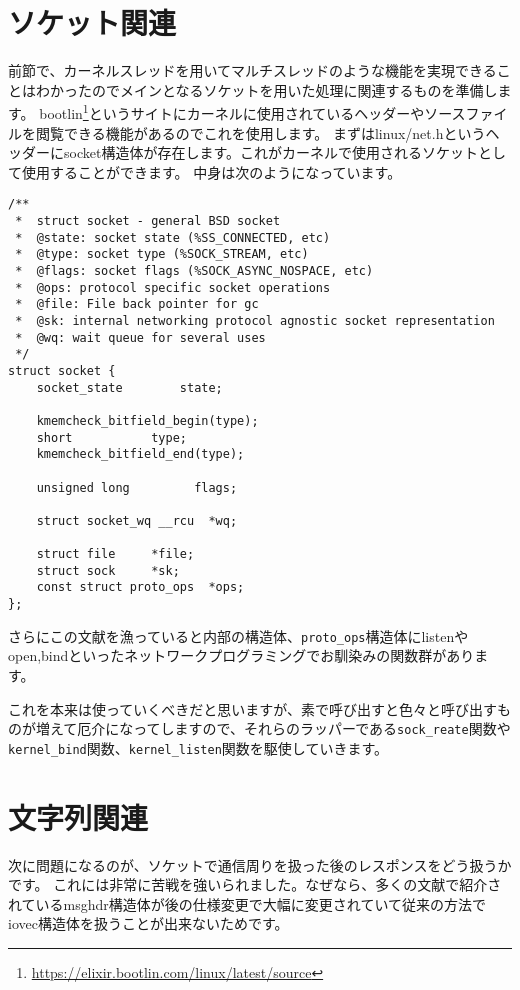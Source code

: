 \section{ソケット関連}

前節で、カーネルスレッドを用いてマルチスレッドのような機能を実現できることはわかったのでメインとなるソケットを用いた処理に関連するものを準備します。
bootlin\footnote{\url{https://elixir.bootlin.com/linux/latest/source}}というサイトにカーネルに使用されているヘッダーやソースファイルを閲覧できる機能があるのでこれを使用します。
まずはlinux/net.hというヘッダーにsocket構造体が存在します。これがカーネルで使用されるソケットとして使用することができます。
中身は次のようになっています。
\begin{verbatim}
/**
 *  struct socket - general BSD socket
 *  @state: socket state (%SS_CONNECTED, etc)
 *  @type: socket type (%SOCK_STREAM, etc)
 *  @flags: socket flags (%SOCK_ASYNC_NOSPACE, etc)
 *  @ops: protocol specific socket operations
 *  @file: File back pointer for gc
 *  @sk: internal networking protocol agnostic socket representation
 *  @wq: wait queue for several uses
 */
struct socket {
    socket_state        state;

    kmemcheck_bitfield_begin(type);
    short           type;
    kmemcheck_bitfield_end(type);

    unsigned long         flags;

    struct socket_wq __rcu  *wq;

    struct file     *file;
    struct sock     *sk;
    const struct proto_ops  *ops;
};
\end{verbatim}

さらにこの文献を漁っていると内部の構造体、\verb|proto_ops|構造体にlistenやopen,bindといったネットワークプログラミングでお馴染みの関数群があります。

これを本来は使っていくべきだと思いますが、素で呼び出すと色々と呼び出すものが増えて厄介になってしますので、それらのラッパーである\verb|sock_reate|関数や\verb|kernel_bind|関数、\verb|kernel_listen|関数を駆使していきます。

\section{文字列関連}
次に問題になるのが、ソケットで通信周りを扱った後のレスポンスをどう扱うかです。
これには非常に苦戦を強いられました。なぜなら、多くの文献で紹介されているmsghdr構造体が後の仕様変更で大幅に変更されていて従来の方法でiovec構造体を扱うことが出来ないためです。

